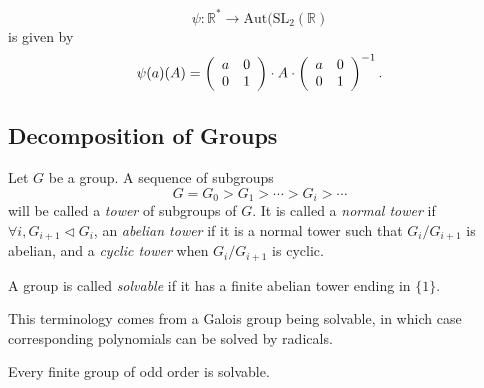 \begin{xmpl}
\begin{enumerate}
{        $$
        \psi : \mathbb{R}^*
           \to \mathrm{Aut}(\mathrm{SL}_2(\mathbb{R})
        $$
        is given by
        $$
        \psi(a)(A) =
          \left(\begin{array}{c c}
            a & 0 \\ 0 & 1
          \end{array}\right) \cdot A \cdot
          \left(\begin{array}{c c}
            a & 0 \\ 0 & 1
          \end{array}\right)^{-1}.
          $$
       }
\end{enumerate}
\end{xmpl}

\subsection{Decomposition of Groups}

\begin{defn}
Let $G$ be a group. A sequence of subgroups
$$
G = G_0 > G_1 > \cdots > G_i > \cdots
$$
will be called a \emph{tower} of subgroups of $G$.
It is called a \emph{normal tower} if
$\forall i, G_{i+1} \triangleleft G_i$, an
\emph{abelian tower} if it is a normal tower such that
$G_{i} / G_{i+1}$ is abelian, and a \emph{cyclic tower}
when $G_{i} / G_{i+1}$ is cyclic.
\end{defn}

\begin{defn}
A group is called \emph{solvable} if it has a finite
abelian tower ending in $\{ 1 \}$.
\end{defn}

This terminology comes from a Galois group being solvable, in which
case corresponding polynomials can be solved by radicals.

\begin{theorem}
  Every finite group of odd order is solvable.
\end{theorem}

